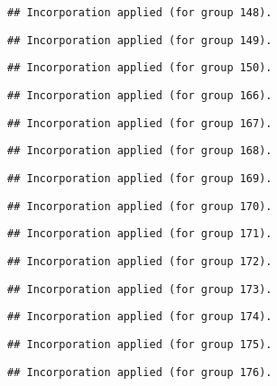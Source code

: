 \documentclass[
  landscape]{article}
\begin{document}
\begin{verbatim}
## Incorporation applied (for group 148).
\end{verbatim}

\begin{verbatim}
## Incorporation applied (for group 149).
\end{verbatim}

\begin{verbatim}
## Incorporation applied (for group 150).
\end{verbatim}

\begin{verbatim}
## Incorporation applied (for group 166).
\end{verbatim}

\begin{verbatim}
## Incorporation applied (for group 167).
\end{verbatim}

\begin{verbatim}
## Incorporation applied (for group 168).
\end{verbatim}

\begin{verbatim}
## Incorporation applied (for group 169).
\end{verbatim}

\begin{verbatim}
## Incorporation applied (for group 170).
\end{verbatim}

\begin{verbatim}
## Incorporation applied (for group 171).
\end{verbatim}

\begin{verbatim}
## Incorporation applied (for group 172).
\end{verbatim}

\begin{verbatim}
## Incorporation applied (for group 173).
\end{verbatim}

\begin{verbatim}
## Incorporation applied (for group 174).
\end{verbatim}

\begin{verbatim}
## Incorporation applied (for group 175).
\end{verbatim}

\begin{verbatim}
## Incorporation applied (for group 176).
\end{verbatim}
\end{document}
